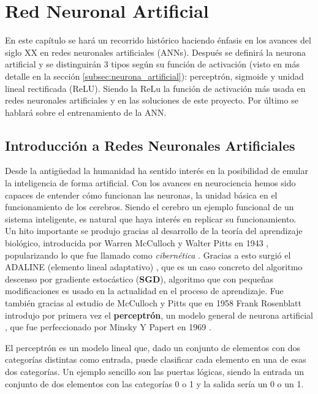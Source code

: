 \chapter{Red Neuronal Artificial}\label{redneuronal}

En este capítulo se hará un recorrido histórico haciendo énfasis en los avances del siglo XX en redes neuronales artificiales (ANNs). Después se definirá la neurona artificial y se distinguirán 3 tipos según su función de activación (visto en más detalle en la sección \ref{subsec:neurona_artificial}): perceptrón, sigmoide y unidad lineal rectificada (ReLU). Siendo la ReLu la función de activación más usada en redes neuronales artificiales \cite{Ramachandran2017} y en las soluciones de este proyecto. Por último se hablará sobre el entrenamiento de la ANN.

\section{Introducción a Redes Neuronales Artificiales}\label{subsec:nn_intro}

Desde la antigüedad la humanidad ha sentido interés en la posibilidad de emular la inteligencia de forma artificial. Con los avances en neurociencia hemos sido capaces de entender cómo funcionan las neuronas, la unidad básica en el funcionamiento de los cerebros. Siendo el cerebro un ejemplo funcional de un sistema inteligente, es natural  que haya interés en replicar su funcionamiento.\\

Un hito importante se produjo gracias al desarrollo de la teoría del aprendizaje biológico, introducida por Warren McCulloch y Walter Pitts en 1943 \cite{McCulloch1943}, popularizando lo que fue llamado como \emph{cibernética} \cite[p13]{Goodfellow2016}. Gracias a esto surgió el ADALINE (elemento lineal adaptativo) \cite{Widrow2015}, que es un caso concreto del algoritmo descenso por gradiente estocástico (\textbf{SGD}), algoritmo que con pequeñas modificaciones es usado en la actualidad en el proceso de aprendizaje\cite[p14]{Goodfellow2016}. Fue también gracias al estudio de McCulloch y Pitts que en 1958 Frank Rosenblatt introdujo por primera vez el \textbf{perceptrón}, un modelo general de neurona artificial \cite{Rosenblatt1958}, que fue perfeccionado por Minsky Y Papert en 1969 \cite{Minsky1969}.

El perceptrón es un modelo lineal que, dado un conjunto de elementos con dos categorías distintas como entrada, puede clasificar cada elemento en una de esas dos categorías. Un ejemplo sencillo son las puertas lógicas, siendo la entrada un conjunto de dos elementos con las categorías 0 o 1 y la salida sería un 0 o un 1.

